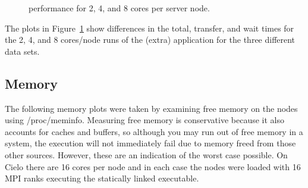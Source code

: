 \begin{figure}[htbp]
\begin{centering}
\vspace{-12pt}



\caption[\Intransit core scaling.] {\Intransit
performance for 2, 4, and 8 cores per server node.}
\label{fig:core-scaling}
\end{centering}
\end{figure}

The plots in Figure~\ref{fig:core-scaling} show differences in the total,
transfer, and wait times for the 2, 4, and 8 cores/node runs of the \intransit
(extra) application for the three different data sets.  




\FloatBarrier

\subsection{Memory}
The following memory plots were taken by examining free memory on the nodes
using /proc/meminfo.  Measuring free memory is conservative because it also
accounts for caches and buffers, so although you may run out of free memory in
a system, the execution will not immediately fail due to memory freed from
those other sources.  However, these are an indication of the worst case
possible.  On Cielo there are 16 cores per node and in each case the nodes were
 loaded with 16 MPI ranks executing the statically linked executable.

